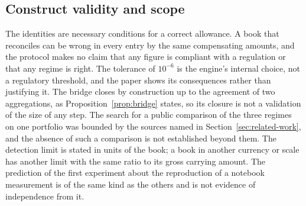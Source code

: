 \subsection{Construct validity and scope}
\label{sec:lim-construct}

The identities are necessary conditions for a correct allowance.
A book that reconciles can be wrong in every entry by the same compensating amounts, and the protocol makes no claim that any figure is compliant with a regulation or that any regime is right.
The tolerance of $10^{-6}$ is the engine's internal choice, not a regulatory threshold, and the paper shows its consequences rather than justifying it.
The bridge closes by construction up to the agreement of two aggregations, as Proposition~\ref{prop:bridge} states, so its closure is not a validation of the size of any step.
The search for a public comparison of the three regimes on one portfolio was bounded by the sources named in Section~\ref{sec:related-work}, and the absence of such a comparison is not established beyond them.
The detection limit is stated in units of the book; a book in another currency or scale has another limit with the same ratio to its gross carrying amount.
The prediction of the first experiment about the reproduction of a notebook measurement is of the same kind as the others and is not evidence of independence from it.
